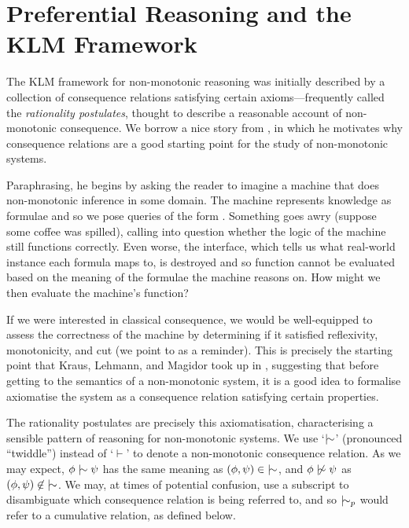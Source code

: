 \section{Preferential Reasoning and the KLM Framework}
\label{section:klm-framework}

The KLM framework for non-monotonic reasoning was initially described by a collection of consequence relations
satisfying certain axioms---frequently called the \textit{rationality postulates}, thought to describe a reasonable
account of non-monotonic consequence. We borrow a nice story from \cite{gabbay1985theoreticalFoundations}, in which he
motivates why consequence relations are a good starting point for the study of non-monotonic systems.

Paraphrasing, he begins by asking the reader to imagine a machine that does non-monotonic inference in some domain. The
machine represents knowledge as formulae and so we pose queries of the form .
Something goes awry (suppose some coffee was spilled), calling into question whether the logic of the machine still functions
correctly. Even worse, the interface, which tells us what real-world instance each formula maps to, is destroyed and so function
cannot be evaluated based on the meaning of the formulae the machine reasons on. How might we then evaluate the machine's
function?

If we were interested in classical consequence, we would be well-equipped to assess the correctness of the machine by determining
if it satisfied reflexivity, monotonicity, and cut (we point to  as a reminder).
This is precisely the starting point that Kraus, Lehmann, and Magidor took up in ,
suggesting that before getting to the semantics of a non-monotonic system, it is a good idea to formalise axiomatise the
system as a consequence relation satisfying certain properties.

The rationality postulates are precisely this axiomatisation, characterising a sensible pattern of reasoning for non-monotonic
systems. We use `$\twiddle$' (pronounced ``twiddle'') instead of `$\vdash$' to denote a non-monotonic consequence relation.
As we may expect, $\phi \twiddle \psi$ has the same meaning as $(\phi, \psi) \in \; \twiddle$, and $\phi \ntwiddle \psi$
as $(\phi, \psi)\not \in \; \twiddle$. We may, at times of potential confusion, use a subscript to disambiguate which consequence
relation is being referred to, and so $\twiddle_{p}$ would refer to a cumulative relation, as defined below.

